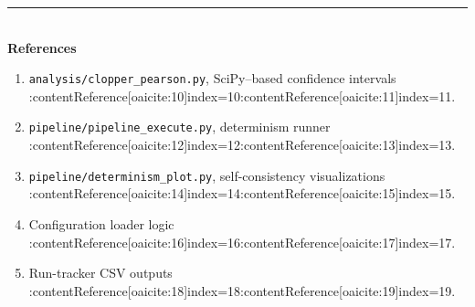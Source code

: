 \documentclass{report}
\begin{document}
	\vfill
	\noindent\rule{\textwidth}{0.4pt}\\
	\textbf{References}
	\begin{enumerate}
		\item \texttt{analysis/clopper\_pearson.py}, SciPy–based confidence intervals :contentReference[oaicite:10]{index=10}:contentReference[oaicite:11]{index=11}.
		\item \texttt{pipeline/pipeline\_execute.py}, determinism runner :contentReference[oaicite:12]{index=12}:contentReference[oaicite:13]{index=13}.
		\item \texttt{pipeline/determinism\_plot.py}, self-consistency visualizations :contentReference[oaicite:14]{index=14}:contentReference[oaicite:15]{index=15}.
		\item Configuration loader logic :contentReference[oaicite:16]{index=16}:contentReference[oaicite:17]{index=17}.
		\item Run-tracker CSV outputs :contentReference[oaicite:18]{index=18}:contentReference[oaicite:19]{index=19}.
	\end{enumerate}
	
\end{document}
